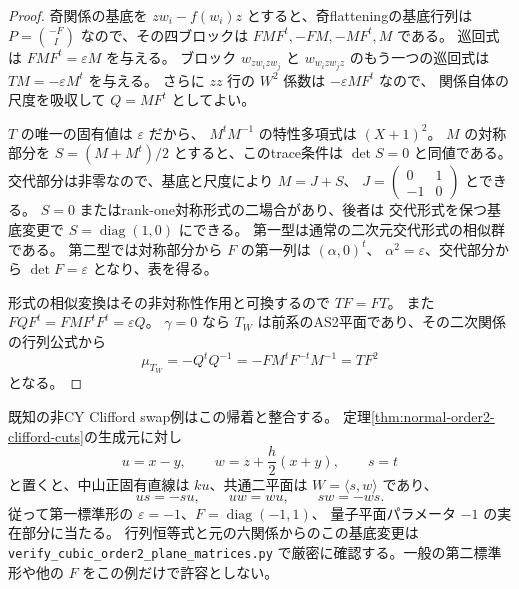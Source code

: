 \begin{proof}
奇関係の基底を $zw_i-f(w_i)z$ とすると、奇flatteningの基底行列は
$P=\binom{-F}{I}$ なので、その四ブロックは
$FMF^t,-FM,-MF^t,M$ である。
巡回式は $FMF^t=\varepsilon M$ を与える。
ブロック $w_{z w_i z w_j}$ と $w_{w_i z w_j z}$ のもう一つの巡回式は
$T M=-\varepsilon M^t$ を与える。
さらに $zz$ 行の $W^2$ 係数は $-\varepsilon MF^t$ なので、
関係自体の尺度を吸収して $Q=MF^t$ としてよい。

$T$ の唯一の固有値は $\varepsilon$ だから、
$M^tM^{-1}$ の特性多項式は $(X+1)^2$。
$M$ の対称部分を $S=(M+M^t)/2$ とすると、このtrace条件は $\det S=0$ と同値である。
交代部分は非零なので、基底と尺度により $M=J+S$、
$J=\begin{pmatrix}0&1\\-1&0\end{pmatrix}$ とできる。
$S=0$ またはrank-one対称形式の二場合があり、後者は
交代形式を保つ基底変更で $S=\operatorname{diag}(1,0)$ にできる。
第一型は通常の二次元交代形式の相似群である。
第二型では対称部分から $F$ の第一列は $(\alpha,0)^t$、
$\alpha^2=\varepsilon$、交代部分から $\det F=\varepsilon$ となり、表を得る。

形式の相似変換はその非対称性作用と可換するので $TF=FT$。
また $FQF^t=FMF^tF^t=\varepsilon Q$。
$\gamma=0$ なら $T_W$ は前系のAS2平面であり、その二次関係の行列公式から
\[
 \mu_{T_W}=-Q^tQ^{-1}
 =-FM^tF^{-t}M^{-1}=TF^2
\]
となる。
\end{proof}

既知の非CY Clifford swap例はこの帰着と整合する。
定理\ref{thm:normal-order2-clifford-cuts}の生成元に対し
\[
 u=x-y,\qquad w=z+\frac h2(x+y),\qquad s=t
\]
と置くと、中山正固有直線は $ku$、共通二平面は $W=\langle s,w\rangle$ であり、
\[
 us=-su,\qquad uw=wu,\qquad sw=-ws.
\]
従って第一標準形の $\varepsilon=-1$、$F=\operatorname{diag}(-1,1)$、
量子平面パラメータ $-1$ の実在部分に当たる。
行列恒等式と元の六関係からのこの基底変更は
\texttt{verify\_\allowbreak{}cubic\_\allowbreak{}order2\_\allowbreak{}plane\_\allowbreak{}matrices.py}
で厳密に確認する。一般の第二標準形や他の $F$ をこの例だけで許容としない。

